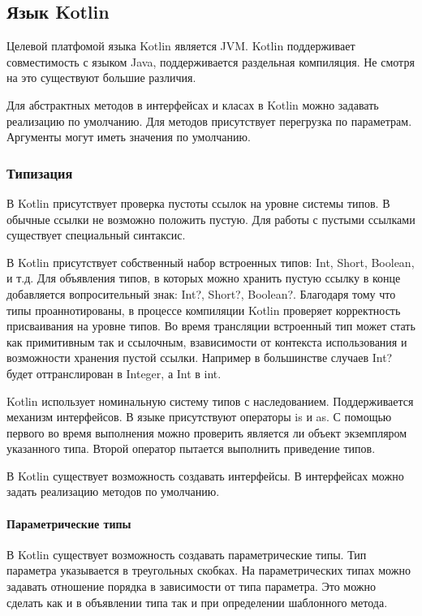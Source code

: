 \subsection{Язык Kotlin}

Целевой платфомой языка Kotlin является JVM. Kotlin поддерживает совместимость с языком Java\cite{kotlin:compatibility}, поддерживается раздельная компиляция. Не смотря на это существуют большие различия.

Для абстрактных методов в интерфейсах и класах в Kotlin можно задавать реализацию по умолчанию. Для методов присутствует перегрузка по параметрам. Аргументы могут иметь значения по умолчанию.

\subsubsection{Типизация}
В Kotlin присутствует проверка пустоты ссылок на уровне системы типов. В обычные ссылки не возможно положить пустую. Для работы с пустыми ссылками существует специальный синтаксис.

В Kotlin присутствует собственный набор встроенных типов: Int, Short, Boolean, и т.д. Для объявления типов, в которых можно хранить пустую ссылку в конце добавляется вопросительный знак: Int?, Short?, Boolean?. Благодаря тому что типы проаннотированы, в процессе компиляции Kotlin проверяет корректность присваивания на уровне типов. Во время трансляции встроенный тип может стать как примитивным так и ссылочным, взависимости от контекста использования и возможности хранения пустой ссылки. Например в большинстве случаев Int? будет оттранслирован в Integer, а Int в int.

Kotlin использует номинальную систему типов с наследованием. Поддерживается механизм интерфейсов. В языке присутствуют операторы is и as. С помощью первого во время выполнения можно проверить является ли объект экземпляром указанного типа. Второй оператор пытается выполнить приведение типов.

В Kotlin существует возможность создавать интерфейсы. В интерфейсах можно задать реализацию методов по умолчанию.

\paragraph{Параметрические типы}
В Kotlin существует возможность создавать параметрические типы. Тип параметра указывается в треугольных скобках. На параметрических типах можно задавать отношение порядка в зависимости от типа параметра. Это можно сделать как и в объявлении типа так и при определении шаблонного метода.

